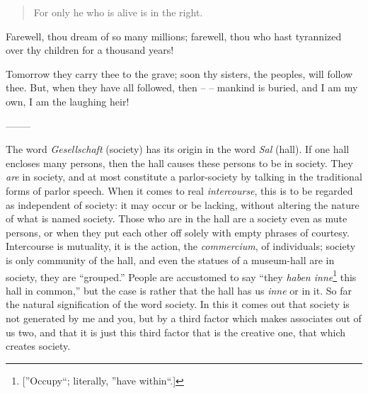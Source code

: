 \documentclass[12pt,a4paper]{book}
\begin{document}
\begin{quotation}

\noindent{}For only he who is alive is in the right.\end{quotation}

\noindent{}Farewell, thou dream of so many millions; farewell, thou who hast 
tyrannized over thy children for a thousand years!

Tomorrow they carry thee to the grave; soon thy sisters, the peoples, will 
follow thee. But, when they have all followed, then -- -- mankind is buried, 
and I am my own, I am the laughing heir!

\begin{center}
--------\end{center}


The word \textit{Gesellschaft} (society) has its origin in the word 
\textit{Sal} (hall). If one hall encloses many persons, then the hall causes 
these persons to be in society. They \textit{are} in society, and at most 
constitute a parlor-society by talking in the traditional forms of parlor 
speech. When it comes to real \textit{intercourse}, this is to be regarded as 
independent of society: it may occur or be lacking, without altering the 
nature of what is named society. Those who are in the hall are a society even 
as mute persons, or when they put each other off solely with empty phrases of 
courtesy. Intercourse is mutuality, it is the action, the \textit{commercium}, 
of individuals; society is only community of the hall, and even the statues of 
a museum-hall are in society, they are ``grouped.'' People are accustomed to 
say ``they \textit{haben inne}\footnote{[''Occupy``; literally, ''have 
within``.]} this hall in common,'' but the case is rather that the hall has 
us \textit{inne} or in it. So far the natural signification of the word 
society. In this it comes out that society is not generated by me and you, but 
by a third factor which makes associates out of us two, and that it is just 
this third factor that is the creative one, that which creates society.
\end{document}
